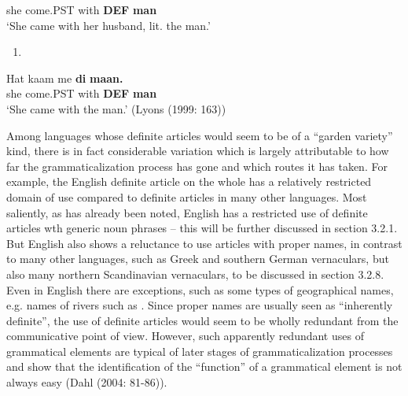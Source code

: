 she  come.PST  with  \textbf{DEF} \textbf{man}\\ %


‘She came with her husband, lit. the man.’
\z


\begin{enumerate} %
\item 
\end{enumerate} %
\ea\label{}
\gll Hat  kaam  me  \textbf{di}\textbf{  maan.}\\


she  come.PST  with  \textbf{DEF} \textbf{man}\\ %


 ‘She came with the man.’ (Lyons (1999: 163))
\z

Among languages whose definite articles would seem to be of a “garden variety” kind, there is in fact considerable variation which is largely attributable to how far the grammaticalization process has gone and which routes it has taken. For example, the English definite article on the whole has a relatively restricted domain of use compared to definite articles in many other languages. Most saliently, as has already been noted, English has a restricted use of definite articles wth generic noun phrases – this will be further discussed in section 3.2.1. But English also shows a reluctance to use articles with proper names, in contrast to many other languages, such as Greek and southern German vernaculars, but also many northern Scandinavian vernaculars, to be discussed in section 3.2.8. Even in English there are exceptions, such as some types of geographical names, e.g. names of rivers such as . Since proper names are usually seen as “inherently definite”, the use of definite articles would seem to be wholly redundant from the communicative point of view. However, such apparently redundant uses of grammatical elements are typical of later stages of grammaticalization processes and show that the identification of the “function” of a grammatical element is not always easy (Dahl (2004: 81-86)).

